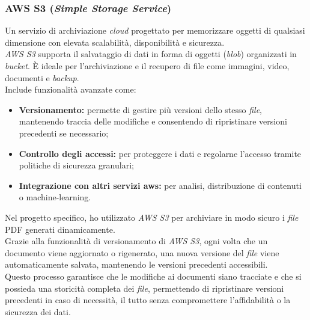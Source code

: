 \subsubsection{AWS S3 (\textit{Simple Storage Service})}

Un servizio di archiviazione \textit{cloud} progettato per memorizzare oggetti di qualsiasi dimensione con elevata scalabilità, disponibilità e sicurezza.\\
\textit{AWS S3} supporta il salvataggio di dati in forma di oggetti (\textit{blob}) organizzati in \textit{bucket}. È ideale per l’archiviazione e il recupero di file come immagini, video, documenti e \textit{backup}.\\

\noindent Include funzionalità avanzate come:
\begin{itemize}
    \item \textbf{Versionamento:} permette di gestire più versioni dello stesso \textit{file}, mantenendo traccia delle modifiche e consentendo di ripristinare versioni precedenti se necessario;
    \item \textbf{Controllo degli accessi:} per proteggere i dati e regolarne l'accesso tramite politiche di sicurezza granulari;
    \item \textbf{Integrazione con altri servizi \gls{aws}:} per analisi, distribuzione di contenuti o \gls{machine-learning}.
\end{itemize}

\noindent Nel progetto specifico, ho utilizzato \textit{AWS S3} per archiviare in modo sicuro i \textit{file} PDF generati dinamicamente.\\
Grazie alla funzionalità di versionamento di \textit{AWS S3}, ogni volta che un documento viene aggiornato o rigenerato, una nuova versione del \textit{file} viene automaticamente salvata, mantenendo le versioni precedenti accessibili.\\
Questo processo garantisce che le modifiche ai documenti siano tracciate e che si possieda una storicità completa dei \textit{file}, permettendo di ripristinare versioni precedenti in caso di necessità, il tutto senza compromettere l'affidabilità o la sicurezza dei dati.